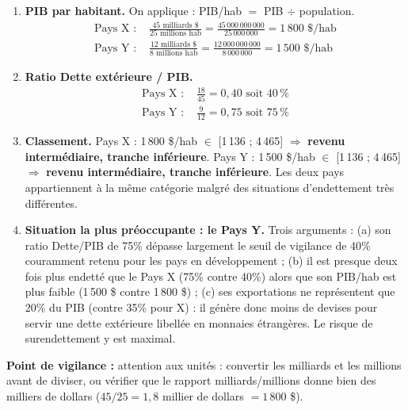\documentclass[11pt]{article}
\begin{document}
\begin{corrige}
\begin{enumerate}
\item \textbf{PIB par habitant.} On applique : PIB/hab $=$ PIB $\div$ population.
\begin{align*}
\text{Pays X : } & \frac{45 \text{ milliards \$}}{25 \text{ millions hab}} = \frac{45\,000\,000\,000}{25\,000\,000} = 1\,800 \text{ \$/hab} \\
\text{Pays Y : } & \frac{12 \text{ milliards \$}}{8 \text{ millions hab}} = \frac{12\,000\,000\,000}{8\,000\,000} = 1\,500 \text{ \$/hab}
\end{align*}
\item \textbf{Ratio Dette extérieure / PIB.}
\begin{align*}
\text{Pays X : } & \frac{18}{45} = 0{,}40 \text{ soit } 40\,\% \\
\text{Pays Y : } & \frac{9}{12} = 0{,}75 \text{ soit } 75\,\%
\end{align*}
\item \textbf{Classement.} Pays X : 1\,800 \$/hab $\in$ [1\,136 ; 4\,465] $\Rightarrow$ \textbf{revenu intermédiaire, tranche inférieure}. Pays Y : 1\,500 \$/hab $\in$ [1\,136 ; 4\,465] $\Rightarrow$ \textbf{revenu intermédiaire, tranche inférieure}. Les deux pays appartiennent à la même catégorie malgré des situations d'endettement très différentes.
\item \textbf{Situation la plus préoccupante : le Pays Y.} Trois arguments : (a) son ratio Dette/PIB de 75\% dépasse largement le seuil de vigilance de 40\% couramment retenu pour les pays en développement ; (b) il est presque deux fois plus endetté que le Pays X (75\% contre 40\%) alors que son PIB/hab est plus faible (1\,500 \$ contre 1\,800 \$) ; (c) ses exportations ne représentent que 20\% du PIB (contre 35\% pour X) : il génère donc moins de devises pour servir une dette extérieure libellée en monnaies étrangères. Le risque de surendettement y est maximal.
\end{enumerate}
\textbf{Point de vigilance :} attention aux unités : convertir les milliards et les millions avant de diviser, ou vérifier que le rapport milliards/millions donne bien des milliers de dollars ($45/25 = 1{,}8$ millier de dollars $= 1\,800$ \$).
\end{corrige}
\end{document}
